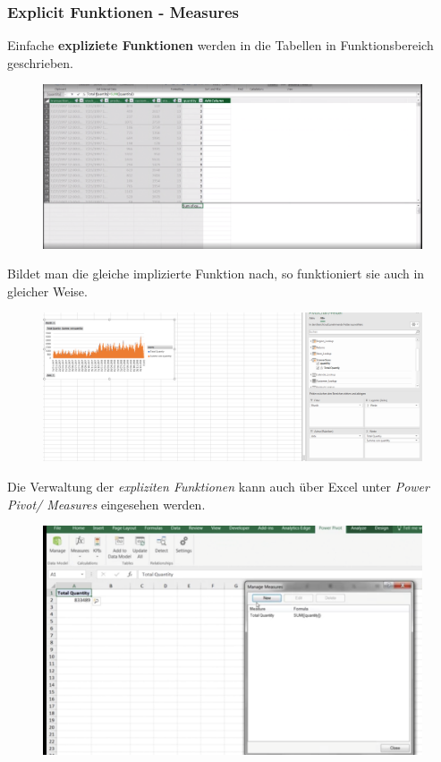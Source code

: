 \subsubsection{Explicit Funktionen - Measures}
Einfache \textbf{expliziete Funktionen} werden in die Tabellen in Funktionsbereich geschrieben. 
\begin{figure}[H]
	\centering
	\includegraphics[scale = 0.3]{attachment/chapter_1/screenshot082}
	\caption{}
	\label{fig:screenshot082}
\end{figure}
Bildet man die gleiche implizierte Funktion nach, so funktioniert sie auch in gleicher Weise.
\begin{figure}[H]
	\centering
	\includegraphics[scale = 0.3]{attachment/chapter_1/screenshot083}
	\caption{}
	\label{fig:screenshot083}
\end{figure}
Die Verwaltung der \textit{expliziten Funktionen} kann auch über Excel unter \textit{Power Pivot/ Measures} eingesehen werden.
\begin{figure}[H]
	\centering
	\includegraphics[scale = 0.3]{attachment/chapter_1/screenshot084}
	\caption{}
	\label{fig:screenshot084}
\end{figure}
